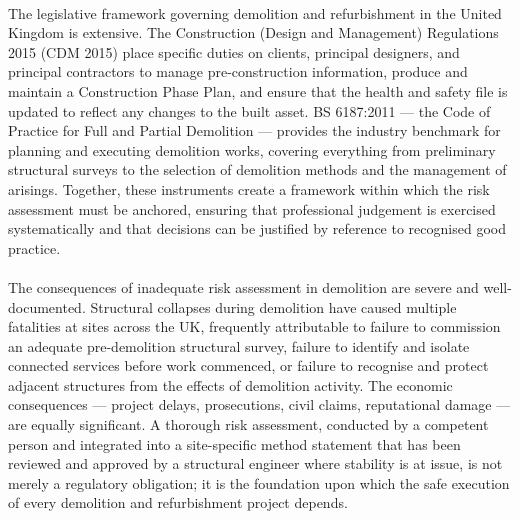 \paragraph{}
The legislative framework governing demolition and refurbishment in the United Kingdom is extensive. The Construction (Design and Management) Regulations 2015 (CDM 2015) place specific duties on clients, principal designers, and principal contractors to manage pre-construction information, produce and maintain a Construction Phase Plan, and ensure that the health and safety file is updated to reflect any changes to the built asset. BS 6187:2011 — the Code of Practice for Full and Partial Demolition — provides the industry benchmark for planning and executing demolition works, covering everything from preliminary structural surveys to the selection of demolition methods and the management of arisings. Together, these instruments create a framework within which the risk assessment must be anchored, ensuring that professional judgement is exercised systematically and that decisions can be justified by reference to recognised good practice.

\paragraph{}
The consequences of inadequate risk assessment in demolition are severe and well-documented. Structural collapses during demolition have caused multiple fatalities at sites across the UK, frequently attributable to failure to commission an adequate pre-demolition structural survey, failure to identify and isolate connected services before work commenced, or failure to recognise and protect adjacent structures from the effects of demolition activity. The economic consequences — project delays, prosecutions, civil claims, reputational damage — are equally significant. A thorough risk assessment, conducted by a competent person and integrated into a site-specific method statement that has been reviewed and approved by a structural engineer where stability is at issue, is not merely a regulatory obligation; it is the foundation upon which the safe execution of every demolition and refurbishment project depends.


